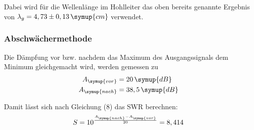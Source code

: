 Dabei wird für die Wellenlänge im Hohlleiter das oben bereits genannte Ergebnis von $\lambda_g = 4,73 \pm 0,13 \, \symup{cm}$ verwendet.

\subsubsection{Abschwächermethode}
Die Dämpfung vor bzw. nachdem das Maximum des Ausgangssignals dem Minimum
gleichgemacht wird, werden gemessen zu
\begin{align*}
  A_\symup{vor} &= 20 \, \symup{dB} \\
  A_\symup{nach} &= 38,5 \, \symup{dB}
\end{align*}

Damit lässt sich nach Gleichung (8) das SWR berechnen:
\begin{equation*}
  S = 10^{\frac{A_\symup{nach}-A_\symup{vor}}{20}} = 8,414
\end{equation*}
